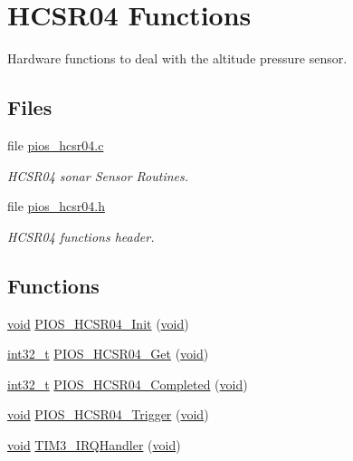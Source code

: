 \hypertarget{group___p_i_o_s___h_c_s_r04}{\section{H\-C\-S\-R04 Functions}
\label{group___p_i_o_s___h_c_s_r04}
}


Hardware functions to deal with the altitude pressure sensor.  


\subsection*{Files}
\begin{DoxyCompactItemize}
\item 
file \hyperlink{pios__hcsr04_8c}{pios\-\_\-hcsr04.\-c}
\begin{DoxyCompactList}\small\item\em H\-C\-S\-R04 sonar Sensor Routines. \end{DoxyCompactList}\item 
file \hyperlink{pios__hcsr04_8h}{pios\-\_\-hcsr04.\-h}
\begin{DoxyCompactList}\small\item\em H\-C\-S\-R04 functions header. \end{DoxyCompactList}\end{DoxyCompactItemize}
\subsection*{Functions}
\begin{DoxyCompactItemize}
\item 
\hyperlink{group___n_a_m_e_ga18028b8badbf1ea7e704ccac3c488e82}{void} \hyperlink{group___p_i_o_s___h_c_s_r04_gadd605086bb317a5093f1c878fe8146a8}{P\-I\-O\-S\-\_\-\-H\-C\-S\-R04\-\_\-\-Init} (\hyperlink{group___n_a_m_e_ga18028b8badbf1ea7e704ccac3c488e82}{void})
\item 
\hyperlink{group___n_a_m_e_gafd12020da5a235dfcf0c3c748fb5baed}{int32\-\_\-t} \hyperlink{group___p_i_o_s___h_c_s_r04_gabca094544c40eb0df7c60891621a3de2}{P\-I\-O\-S\-\_\-\-H\-C\-S\-R04\-\_\-\-Get} (\hyperlink{group___n_a_m_e_ga18028b8badbf1ea7e704ccac3c488e82}{void})
\item 
\hyperlink{group___n_a_m_e_gafd12020da5a235dfcf0c3c748fb5baed}{int32\-\_\-t} \hyperlink{group___p_i_o_s___h_c_s_r04_ga4111a059ae6226a31ac69e550e1bc18a}{P\-I\-O\-S\-\_\-\-H\-C\-S\-R04\-\_\-\-Completed} (\hyperlink{group___n_a_m_e_ga18028b8badbf1ea7e704ccac3c488e82}{void})
\item 
\hyperlink{group___n_a_m_e_ga18028b8badbf1ea7e704ccac3c488e82}{void} \hyperlink{group___p_i_o_s___h_c_s_r04_gae1007c4b9e7a241dcc263f00671f7f4e}{P\-I\-O\-S\-\_\-\-H\-C\-S\-R04\-\_\-\-Trigger} (\hyperlink{group___n_a_m_e_ga18028b8badbf1ea7e704ccac3c488e82}{void})
\item 
\hyperlink{group___n_a_m_e_ga18028b8badbf1ea7e704ccac3c488e82}{void} \hyperlink{group___p_i_o_s___h_c_s_r04_gac8e51d2183b5230cbd5481f8867adce9}{T\-I\-M3\-\_\-\-I\-R\-Q\-Handler} (\hyperlink{group___n_a_m_e_ga18028b8badbf1ea7e704ccac3c488e82}{void})
\end{DoxyCompactItemize}


